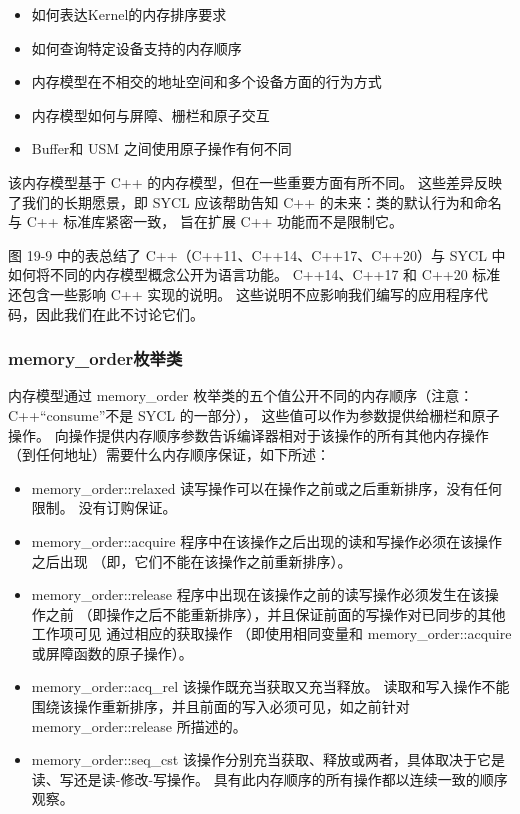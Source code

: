 \begin{itemize}
	\item 如何表达Kernel的内存排序要求

	\item 如何查询特定设备支持的内存顺序

	\item 内存模型在不相交的地址空间和多个设备方面的行为方式

	\item 内存模型如何与屏障、栅栏和原子交互

	\item Buffer和 USM 之间使用原子操作有何不同
\end{itemize}

该内存模型基于 C++ 的内存模型，但在一些重要方面有所不同。 
这些差异反映了我们的长期愿景，即 SYCL 应该帮助告知 C++ 的未来：类的默认行为和命名与 C++ 标准库紧密一致，
旨在扩展 C++ 功能而不是限制它。

图 19-9 中的表总结了 C++（C++11、C++14、C++17、C++20）与 SYCL 中如何将不同的内存模型概念公开为语言功能。 
C++14、C++17 和 C++20 标准还包含一些影响 C++ 实现的说明。 
这些说明不应影响我们编写的应用程序代码，因此我们在此不讨论它们。

\subsubsection{memory\_order枚举类}
内存模型通过 memory\_order 枚举类的五个值公开不同的内存顺序（注意：C++“consume”不是 SYCL 的一部分），
这些值可以作为参数提供给栅栏和原子操作。 
向操作提供内存顺序参数告诉编译器相对于该操作的所有其他内存操作（到任何地址）需要什么内存顺序保证，如下所述：

\begin{itemize}
	\item memory\_order::relaxed 读写操作可以在操作之前或之后重新排序，没有任何限制。 没有订购保证。

	\item memory\_order::acquire 程序中在该操作之后出现的读和写操作必须在该操作之后出现
	（即，它们不能在该操作之前重新排序）。

	\item memory\_order::release 程序中出现在该操作之前的读写操作必须发生在该操作之前
	（即操作之后不能重新排序），并且保证前面的写操作对已同步的其他工作项可见 通过相应的获取操作
	（即使用相同变量和 memory\_order::acquire 或屏障函数的原子操作）。

	\item memory\_order::acq\_rel 该操作既充当获取又充当释放。 
	读取和写入操作不能围绕该操作重新排序，并且前面的写入必须可见，如之前针对 memory\_order::release 所描述的。

	\item memory\_order::seq\_cst 该操作分别充当获取、释放或两者，具体取决于它是读、写还是读-修改-写操作。 
	具有此内存顺序的所有操作都以连续一致的顺序观察。
\end{itemize}

